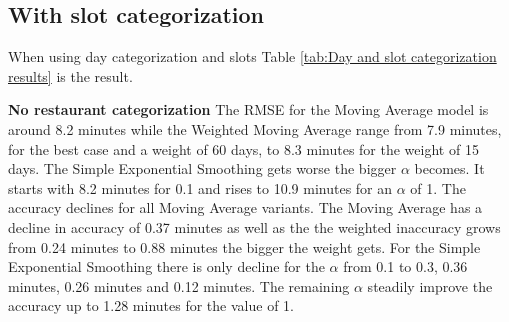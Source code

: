 \subsection{With slot categorization}
When using day categorization and slots Table \ref{tab:Day and slot categorization results} is the result.
\begin{table}[h]
\centering
\caption{Day categorization with slots}
\label{tab:Day and slot categorization results}
\end{table}
\newline\newline\textbf{No restaurant categorization}\newline
The RMSE for the Moving Average model is around 8.2 minutes while the Weighted Moving Average range from 7.9 minutes, for the best case and a weight of 60 days, to 8.3 minutes for the weight of 15 days. The Simple Exponential Smoothing gets worse the bigger $\alpha$ becomes. It starts with 8.2 minutes for 0.1 and rises to 10.9 minutes for an $\alpha$ of 1. The accuracy declines for all Moving Average variants. The Moving Average has a decline in accuracy of 0.37 minutes as well as the the weighted inaccuracy grows from 0.24 minutes to 0.88 minutes the bigger the weight gets. For the Simple Exponential Smoothing there is only decline for the $\alpha$ from 0.1 to 0.3, 0.36 minutes, 0.26 minutes and 0.12 minutes. The remaining $\alpha$ steadily improve the accuracy up to 1.28 minutes for the value of 1.\newline

